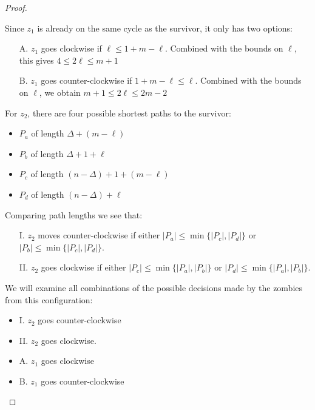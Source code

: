 \begin{proof}
\begin{proofpart}
  Since $z_1$ is already on the same cycle as the survivor, it only has two options:

  \begin{itemize}
   \item[A.] $z_1$ goes clockwise if $\ell \leq 1 + m - \ell$.
         Combined with the bounds on $\ell$, this gives $4 \leq 2 \ell \leq m + 1$

   \item[B.] $z_1$ goes counter-clockwise if $1 + m - \ell \leq \ell$.
         Combined with the bounds on $\ell$, we obtain $m + 1 \leq 2 \ell \leq 2m - 2$
  \end{itemize}

  For $z_2$, there are four possible shortest paths to the survivor:

  \begin{itemize}
   \item $P_a$ of length $\Delta + (m - \ell)$
   \item $P_b$ of length $\Delta + 1 + \ell$
   \item $P_c$ of length $(n-\Delta) + 1 + (m-\ell)$
   \item $P_d$ of length $(n-\Delta) + \ell$
  \end{itemize}

  Comparing path lengths we see that:

  \begin{itemize}
   \item[I.] $z_2$ moves counter-clockwise if either $|P_a| \leq \min \{ |P_c|, |P_d| \}$ or $|P_b| \leq \min \{ |P_c|, |P_d| \}$.

   \item[II.] $z_2$ goes clockwise if either $|P_c| \leq \min \{ |P_a|, |P_b| \}$ or $|P_d| \leq \min \{ |P_a|, |P_b| \}$.
  \end{itemize}

  We will examine all combinations of the possible decisions
  made by the zombies from this configuration:

  \begin{itemize}
   \item I. $z_2$ goes counter-clockwise
   \item II. $z_2$ goes clockwise.
   \item A. $z_1$ goes clockwise
   \item B. $z_1$ goes counter-clockwise
  \end{itemize}


\end{proofpart}
\end{proof}
